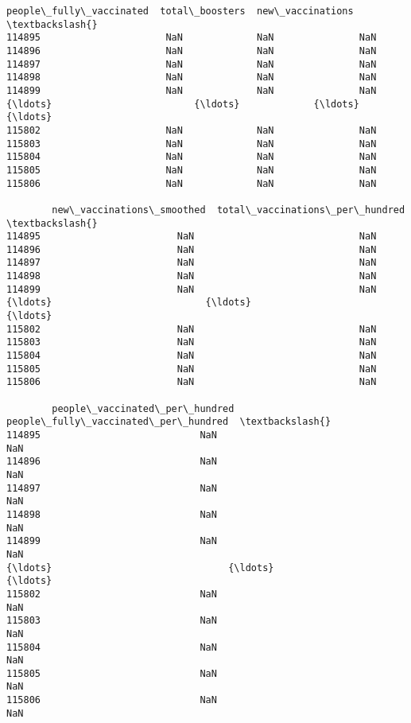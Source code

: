 \documentclass[11pt]{article}
\begin{document}
\begin{tcolorbox}[breakable, size=fbox, boxrule=.5pt, pad at break*=1mm, opacityfill=0]
\begin{Verbatim}[commandchars=\\\{\}]
        people\_fully\_vaccinated  total\_boosters  new\_vaccinations  \textbackslash{}
114895                      NaN             NaN               NaN
114896                      NaN             NaN               NaN
114897                      NaN             NaN               NaN
114898                      NaN             NaN               NaN
114899                      NaN             NaN               NaN
{\ldots}                         {\ldots}             {\ldots}               {\ldots}
115802                      NaN             NaN               NaN
115803                      NaN             NaN               NaN
115804                      NaN             NaN               NaN
115805                      NaN             NaN               NaN
115806                      NaN             NaN               NaN

        new\_vaccinations\_smoothed  total\_vaccinations\_per\_hundred  \textbackslash{}
114895                        NaN                             NaN
114896                        NaN                             NaN
114897                        NaN                             NaN
114898                        NaN                             NaN
114899                        NaN                             NaN
{\ldots}                           {\ldots}                             {\ldots}
115802                        NaN                             NaN
115803                        NaN                             NaN
115804                        NaN                             NaN
115805                        NaN                             NaN
115806                        NaN                             NaN

        people\_vaccinated\_per\_hundred  people\_fully\_vaccinated\_per\_hundred  \textbackslash{}
114895                            NaN                                  NaN
114896                            NaN                                  NaN
114897                            NaN                                  NaN
114898                            NaN                                  NaN
114899                            NaN                                  NaN
{\ldots}                               {\ldots}                                  {\ldots}
115802                            NaN                                  NaN
115803                            NaN                                  NaN
115804                            NaN                                  NaN
115805                            NaN                                  NaN
115806                            NaN                                  NaN


\end{Verbatim}
\end{tcolorbox}
\end{document}
